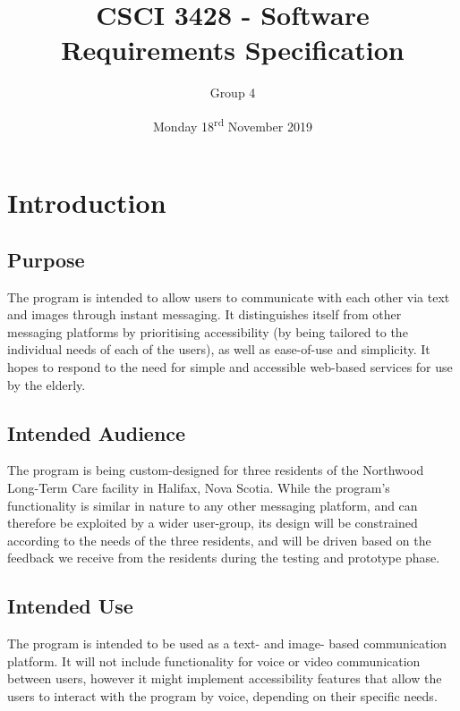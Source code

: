 \documentclass[11pt]{article}
\renewcommand{\headrulewidth}{.3pt}
\renewcommand{\footrulewidth}{.3pt}
\begin{document}
\title{CSCI 3428 - Software Requirements Specification}
\author{Group 4}
\date{Monday 18\textsuperscript{rd} November 2019}
\maketitle

\fancypagestyle{plain}{
\fancyhf{} %
\fancyfoot[r]{\footnotesize \thepage} %
\fancyfoot[l]{\small\scshape SRS} %
\renewcommand{\headrulewidth}{0pt}
\renewcommand{\footrulewidth}{.3pt}}

\section{Introduction}
\subsection{Purpose}
The program is intended to allow users to communicate with each other via text and images through
instant messaging. It distinguishes itself from other messaging platforms by prioritising
accessibility (by being tailored to the individual needs of each of the users), as well as
ease-of-use and simplicity. It hopes to respond to the need for simple and accessible web-based
services for use by the elderly.

\subsection{Intended Audience}
The program is being custom-designed for three residents of the Northwood Long-Term Care
facility in Halifax, Nova Scotia. While the program's functionality is similar in nature to any
other messaging platform, and can therefore be exploited by a wider user-group, its design will be
constrained according to the needs of the three residents, and will be driven based on the feedback
we receive from the residents during the testing and prototype phase.

\subsection{Intended Use}
The program is intended to be used as a text- and image- based communication platform. It will not
include functionality for voice or video communication between users, however it might implement
accessibility features that allow the users to interact with the program by voice, depending on
their specific needs.
\end{document}
